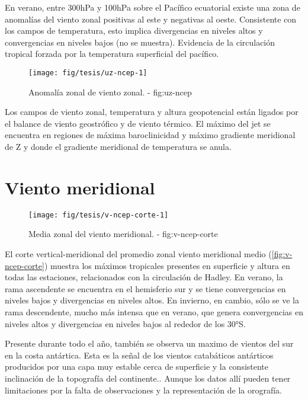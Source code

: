 \documentclass[spanish,a4paper]{book}
\begin{document}
En verano, entre 300hPa y 100hPa sobre el Pacífico ecuatorial existe una
zona de anomalías del viento zonal positivas al este y negativas al
oeste. Consistente con los campos de temperatura, esto implica
divergencias en niveles altos y convergencias en niveles bajos (no se
muestra). Evidencia de la circulación tropical forzada por la
temperatura superficial del pacífico.

\begin{landscape}\begin{figure}

{\centering \texttt{[image: fig/tesis/uz-ncep-1]} 

}

\caption{Anomalía zonal de viento zonal. - fig:uz-ncep}\label{fig:uz-ncep}
\end{figure}
\end{landscape}

Los campos de viento zonal, temperatura y altura geopotencial están
ligados por el balance de viento geostrófico y de viento térmico. El
máximo del jet se encuentra en regiones de máxima baroclinicidad y
máximo gradiente meridional de Z y donde el gradiente meridional de
temperatura se anula.

\section{Viento meridional}\label{viento-meridional}

\begin{figure}

{\centering \texttt{[image: fig/tesis/v-ncep-corte-1]} 

}

\caption{Media zonal del viento meridional. - fig:v-ncep-corte}\label{fig:v-ncep-corte}
\end{figure}

El corte vertical-meridional del promedio zonal viento meridional medio
(\autoref{fig:v-ncep-corte}) muestra los máximos tropicales presentes en
superficie y altura en todas las estaciones, relacionados con la
circulación de Hadley. En verano, la rama ascendente se encuentra en el
hemisferio sur y se tiene convergencias en niveles bajos y divergencias
en niveles altos. En invierno, en cambio, sólo se ve la rama
descendente, mucho más intensa que en verano, que genera convergencias
en niveles altos y divergencias en niveles bajos al rededor de los 30°S.

Presente durante todo el año, también se observa un maximo de vientos
del sur en la costa antártica. Esta es la señal de los vientos
catabáticos antárticos producidos por una capa muy estable cerca de
superficie y la consistente inclinación de la topografía del
continente.. Aunque los datos allí pueden tener
limitaciones por la falta de observaciones y la representación de la
orografía.
\end{document}
